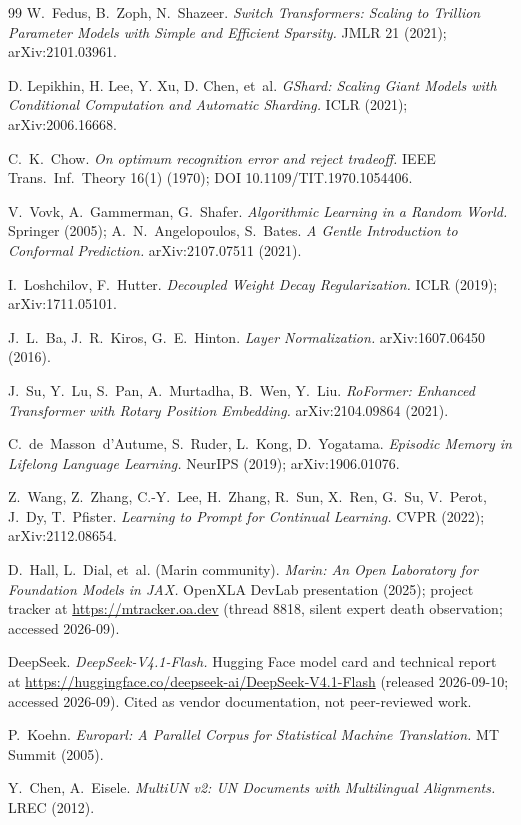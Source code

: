 \documentclass[11pt]{article}
\theoremstyle{definition}\newtheorem{definition}{Definition}
\theoremstyle{remark}\newtheorem{remark}{Remark}
\begin{document}
\begin{thebibliography}{99}
 W.~Fedus, B.~Zoph, N.~Shazeer. \emph{Switch Transformers: Scaling to
Trillion Parameter Models with Simple and Efficient Sparsity.} JMLR 21 (2021); arXiv:2101.03961.

 D. Lepikhin, H. Lee, Y. Xu, D. Chen, et~al. \emph{GShard: Scaling Giant Models with Conditional Computation and Automatic Sharding.} ICLR (2021); arXiv:2006.16668.

 C.~K.~Chow. \emph{On optimum recognition error and reject tradeoff.} IEEE Trans.\ Inf.\ Theory 16(1) (1970); DOI 10.1109/TIT.1970.1054406.

 V.~Vovk, A.~Gammerman, G.~Shafer. \emph{Algorithmic Learning in
a Random World.} Springer (2005); A.~N.~Angelopoulos, S.~Bates. \emph{A Gentle
Introduction to Conformal Prediction.} arXiv:2107.07511 (2021).

 I.~Loshchilov, F.~Hutter. \emph{Decoupled Weight Decay
Regularization.} ICLR (2019); arXiv:1711.05101.

 J.~L.~Ba, J.~R.~Kiros, G.~E.~Hinton. \emph{Layer
Normalization.} arXiv:1607.06450 (2016).

 J.~Su, Y.~Lu, S.~Pan, A.~Murtadha, B.~Wen, Y.~Liu. \emph{RoFormer:
Enhanced Transformer with Rotary Position Embedding.} arXiv:2104.09864 (2021).

 C.~de~Masson~d'Autume, S.~Ruder, L.~Kong, D.~Yogatama. \emph{Episodic
Memory in Lifelong Language Learning.} NeurIPS (2019); arXiv:1906.01076.

 Z.~Wang, Z.~Zhang, C.-Y.~Lee, H.~Zhang, R.~Sun, X.~Ren, G.~Su, V.~Perot,
J.~Dy, T.~Pfister. \emph{Learning to Prompt for Continual Learning.} CVPR (2022); arXiv:2112.08654.

 D.~Hall, L.~Dial, et~al. (Marin community). \emph{Marin: An Open
Laboratory for Foundation Models in JAX.} OpenXLA DevLab presentation (2025);
project tracker at \url{https://mtracker.oa.dev} (thread 8818, silent expert death
observation; accessed 2026-09).

 DeepSeek. \emph{DeepSeek-V4.1-Flash.} Hugging Face model card and
technical report at \url{https://huggingface.co/deepseek-ai/DeepSeek-V4.1-Flash}
(released 2026-09-10; accessed 2026-09). Cited as vendor documentation, not
peer-reviewed work.

 P.~Koehn. \emph{Europarl: A Parallel Corpus for Statistical Machine
Translation.} MT Summit (2005).

 Y.~Chen, A.~Eisele. \emph{MultiUN v2: UN Documents with Multilingual
Alignments.} LREC (2012).

\end{thebibliography}
\end{document}
